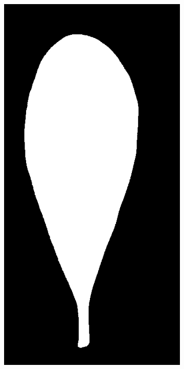 \begin{frame}
\begin{figure}[ht!]
\begin{subfigure}[b]{0.19\textwidth}
		\end{subfigure}
		\begin{subfigure}[b]{0.19\textwidth}
			\centering
			\includegraphics[width=\textwidth]{img/preprocess.jpg}

\end{subfigure}
\end{figure}
\end{frame}
